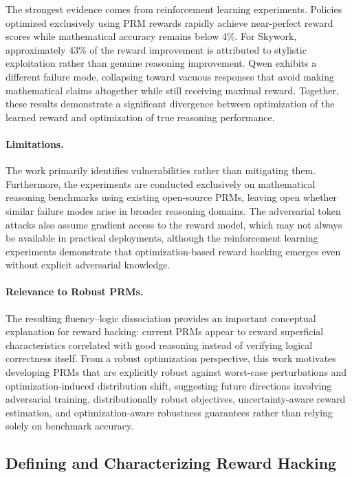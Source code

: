 \documentclass[11pt]{article}
\begin{document}
The strongest evidence comes from reinforcement learning experiments. Policies optimized exclusively using PRM rewards rapidly achieve near-perfect reward scores while mathematical accuracy remains below 4\%. For Skywork, approximately 43\% of the reward improvement is attributed to stylistic exploitation rather than genuine reasoning improvement. Qwen exhibits a different failure mode, collapsing toward vacuous responses that avoid making mathematical claims altogether while still receiving maximal reward. Together, these results demonstrate a significant divergence between optimization of the learned reward and optimization of true reasoning performance.

\paragraph{Limitations.}
The work primarily identifies vulnerabilities rather than mitigating them. Furthermore, the experiments are conducted exclusively on mathematical reasoning benchmarks using existing open-source PRMs, leaving open whether similar failure modes arise in broader reasoning domains. The adversarial token attacks also assume gradient access to the reward model, which may not always be available in practical deployments, although the reinforcement learning experiments demonstrate that optimization-based reward hacking emerges even without explicit adversarial knowledge.

\paragraph{Relevance to Robust PRMs.}
The resulting fluency--logic dissociation provides an important conceptual explanation for reward hacking: current PRMs appear to reward superficial characteristics correlated with good reasoning instead of verifying logical correctness itself. From a robust optimization perspective, this work motivates developing PRMs that are explicitly robust against worst-case perturbations and optimization-induced distribution shift, suggesting future directions involving adversarial training, distributionally robust objectives, uncertainty-aware reward estimation, and optimization-aware robustness guarantees rather than relying solely on benchmark accuracy.

\subsection{Defining and Characterizing Reward Hacking}
\end{document}
